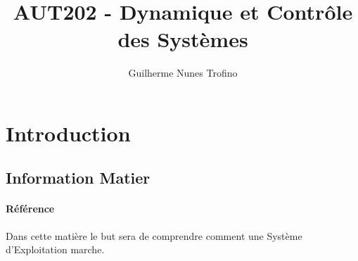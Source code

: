 \documentclass{article}
\title{AUT202 - Dynamique et Contrôle des Systèmes}
\author{Guilherme Nunes Trofino}
\begin{document}
\maketitle
\setlength{\parindent}{0pt}

\newpage\tableofcontents

\section{Introduction}

% 
% 
% 

\subsection{Information Matier}
\paragraph{Référence}Dans cette matière le but sera de comprendre comment une Système d'Exploitation marche.







\end{document}
